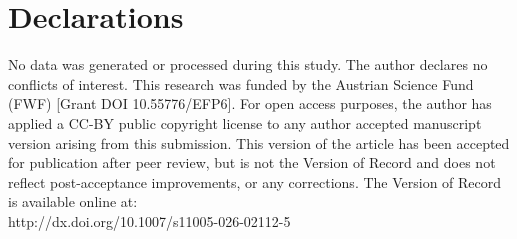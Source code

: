 \documentclass[a4paper,11pt]{amsart}
\begin{document}
\section*{Declarations}

No data was generated or processed during this study. The author declares no conflicts of interest. This research was funded by the Austrian Science Fund (FWF) [Grant DOI 10.55776/EFP6]. For open access purposes, the author has applied a CC-BY public copyright license to any author accepted manuscript version arising from this submission. This version of the article has been accepted for publication after peer review, but is not the Version of Record and does not reflect post-acceptance improvements, or any corrections. The Version of Record is available online at: \\ http://dx.doi.org/10.1007/s11005-026-02112-5



\end{document}
